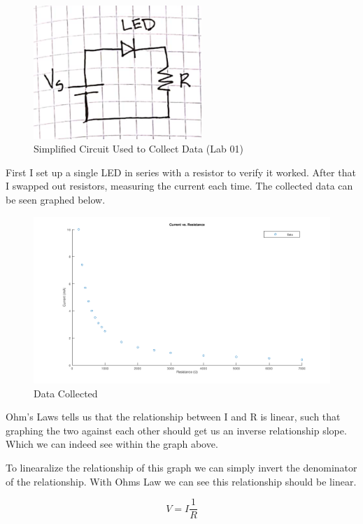 \documentclass[prb,preprint]{revtex4-1}
\begin{document}
\begin{figure}[ht]
	\centering
	\includegraphics[width=2.5in]{figure1.png}
	\caption{Simplified Circuit Used to Collect Data (Lab 01)}
	\label{fig1}
\end{figure}

First I set up a single LED in series with a resistor to verify it worked. After that I swapped out resistors, measuring the current each time. The collected data can be seen graphed below.

\begin{figure}[ht]
	\centering
	\includegraphics[width=6in]{bigGraph.png}
	\caption{Data Collected}
	\label{fig1}
\end{figure}


Ohm's Laws tells us that the relationship between I and R is linear, such that graphing the two against each other should get us an inverse relationship slope. Which we can indeed see within the graph above.

To linearalize the relationship of this graph we can simply invert the denominator of the relationship. With Ohms Law we can see this relationship should be linear. 

\begin{equation}
V=I\frac{1}{R}
\end{equation}
\end{document}
